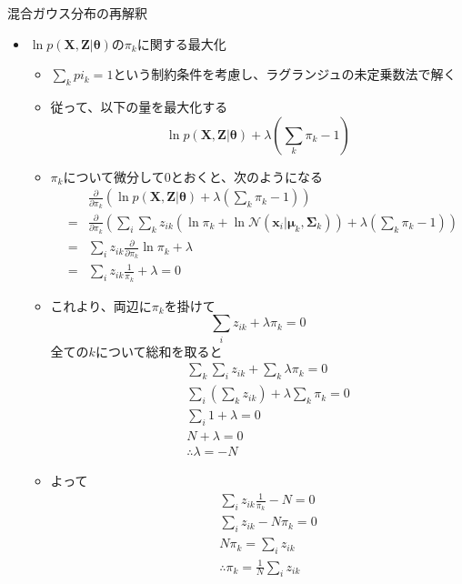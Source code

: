 \documentclass[dvipdfmx,notheorems,t]{beamer}
\begin{document}
\begin{frame}{混合ガウス分布の再解釈}

\begin{itemize}
	\item $\ln p(\bm{X}, \bm{Z} | \bm{\theta})$の$\pi_k$に関する最大化
	\begin{itemize}
		\item $\sum_k pi_k = 1$という制約条件を考慮し、ラグランジュの未定乗数法で解く
		\item 従って、以下の量を最大化する
		\begin{equation}
			\ln p(\bm{X}, \bm{Z} | \bm{\theta}) + \lambda \left( \sum_k \pi_k - 1 \right)
		\end{equation}
		
		\item $\pi_k$について微分して$0$とおくと、次のようになる
		\begin{eqnarray}
			&& \frac{\partial}{\partial \pi_k} \left( \ln p(\bm{X}, \bm{Z} | \bm{\theta}) + \lambda \left( \sum_k \pi_k - 1 \right) \right) \nonumber \\
			&=& \frac{\partial}{\partial \pi_k} \left( \sum_i \sum_k z_{ik} \left( \ln \pi_k + \ln \mathcal{N}(\bm{x}_i | \bm{\mu}_k, \bm{\Sigma}_k) \right) + \lambda \left( \sum_k \pi_k - 1 \right) \right) \nonumber \\
			&=& \sum_i z_{ik} \frac{\partial}{\partial \pi_k} \ln \pi_k + \lambda \nonumber \\
			&=& \sum_i z_{ik} \frac{1}{\pi_k} + \lambda = 0
		\end{eqnarray}
		
		\item これより、両辺に$\pi_k$を掛けて
		\begin{equation}
			\sum_i z_{ik} + \lambda \pi_k = 0
		\end{equation}
		全ての$k$について総和を取ると
		\begin{eqnarray}
			&& \sum_k \sum_i z_{ik} + \sum_k \lambda \pi_k = 0 \nonumber \\
			&& \sum_i \left( \sum_k z_{ik} \right) + \lambda \sum_k \pi_k = 0 \nonumber \\
			&& \sum_i 1 + \lambda = 0 \nonumber \\
			&& N + \lambda = 0 \nonumber \\
			&& \therefore \lambda = -N
		\end{eqnarray}
		
		\item よって
		\begin{eqnarray}
			&& \sum_i z_{ik} \frac{1}{\pi_k} - N = 0 \nonumber \\
			&& \sum_i z_{ik} - N \pi_k = 0 \nonumber \\
			&& N \pi_k = \sum_i z_{ik} \nonumber \\
			&& \therefore \pi_k = \frac{1}{N} \sum_i z_{ik}
		\end{eqnarray}
		

\end{itemize}
\end{itemize}
\end{frame}
\end{document}

